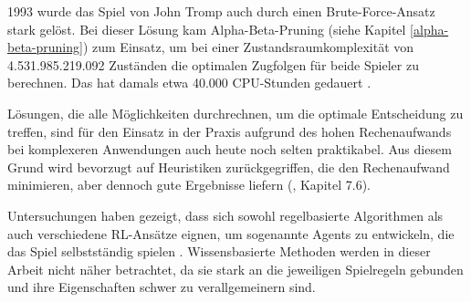 1993 wurde das Spiel von John Tromp auch durch einen Brute-Force-Ansatz stark gelöst. Bei dieser Lösung kam Alpha-Beta-Pruning (siehe Kapitel \ref{alpha-beta-pruning}) zum Einsatz, um bei einer Zustandsraumkomplexität von 4.531.985.219.092 Zuständen die optimalen Zugfolgen für beide Spieler zu berechnen. Das hat damals etwa 40.000 CPU-Stunden gedauert \cite{Tromp}.

Lösungen, die alle Möglichkeiten durchrechnen, um die optimale Entscheidung zu treffen, sind für den Einsatz in der Praxis aufgrund des hohen Rechenaufwands bei komplexeren Anwendungen auch heute noch selten praktikabel. Aus diesem Grund wird bevorzugt auf Heuristiken zurückgegriffen, die den Rechenaufwand minimieren, aber dennoch gute Ergebnisse liefern (\cite{Heineman.October2008}, Kapitel 7.6).

Untersuchungen haben gezeigt, dass sich sowohl regelbasierte Algorithmen als auch verschiedene RL-Ansätze eignen, um sogenannte Agents zu entwickeln, die das Spiel selbstständig spielen \cite{Thill.2012} \cite{Wäldchen.2022} \cite{Taylor.2024} \cite{Sheoran.2022} \cite{Qiu.2022}. Wissensbasierte Methoden werden in dieser Arbeit nicht näher betrachtet, da sie stark an die jeweiligen Spielregeln gebunden und ihre Eigenschaften schwer zu verallgemeinern sind.
